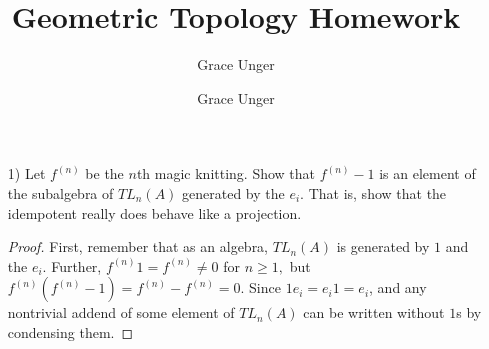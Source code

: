 \documentclass{article}
\author{Grace Unger}
\author{Grace Unger}
\title{Geometric Topology Homework}
\begin{document}
\maketitle

\begin{enumerate}
    \item[1)] Let $f^{(n)}$ be the $n$th magic knitting. Show that $f^{(n)}-1$ is an element of the subalgebra of $TL_n(A)$ generated by the $e_i.$ That is, show that the idempotent really does behave like a projection.
    \begin{proof}
        First, remember that as an algebra, $TL_n(A)$ is generated by $1$ and the $e_i$. Further, $f^{(n)}1 = f^{(n)} \neq 0$ for $n\ge 1,$ but $f^{(n)}(f^{(n)}-1) = f^{(n)}-f^{(n)} = 0.$ Since $1e_i = e_i1 = e_i$, and any nontrivial addend of some element of $TL_n(A)$ can be written without $1$s by condensing them. 
    \end{proof}
\end{enumerate}
\end{document}
